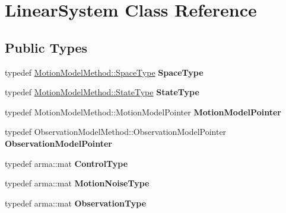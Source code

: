 \hypertarget{class_linear_system}{\section{\-Linear\-System \-Class \-Reference}
\label{class_linear_system}
}
\subsection*{\-Public \-Types}
\begin{DoxyCompactItemize}
\item 
\hypertarget{class_linear_system_a6e2a2cea01eb7d624ebddbd35da87391}{typedef \*
\hyperlink{class_s_e2_belief_space}{\-Motion\-Model\-Method\-::\-Space\-Type} {\bfseries \-Space\-Type}}\label{class_linear_system_a6e2a2cea01eb7d624ebddbd35da87391}

\item 
\hypertarget{class_linear_system_a18a7ea2657a1fbca633a2dfb92fbdfcc}{typedef \*
\hyperlink{class_s_e2_belief_space_1_1_state_type}{\-Motion\-Model\-Method\-::\-State\-Type} {\bfseries \-State\-Type}}\label{class_linear_system_a18a7ea2657a1fbca633a2dfb92fbdfcc}

\item 
\hypertarget{class_linear_system_a45a2dc5d393c50bc2d475cd9f4ff1db0}{typedef \*
\-Motion\-Model\-Method\-::\-Motion\-Model\-Pointer {\bfseries \-Motion\-Model\-Pointer}}\label{class_linear_system_a45a2dc5d393c50bc2d475cd9f4ff1db0}

\item 
\hypertarget{class_linear_system_a239819b1a3b5554c9b1ffbe669492b6e}{typedef \*
\-Observation\-Model\-Method\-::\-Observation\-Model\-Pointer {\bfseries \-Observation\-Model\-Pointer}}\label{class_linear_system_a239819b1a3b5554c9b1ffbe669492b6e}

\item 
\hypertarget{class_linear_system_ac89acd811aeb518081df96fb3904b176}{typedef arma\-::mat {\bfseries \-Control\-Type}}\label{class_linear_system_ac89acd811aeb518081df96fb3904b176}

\item 
\hypertarget{class_linear_system_abdf29233ee72fe498a01fe4bae172efd}{typedef arma\-::mat {\bfseries \-Motion\-Noise\-Type}}\label{class_linear_system_abdf29233ee72fe498a01fe4bae172efd}

\item 
\hypertarget{class_linear_system_a331ff229efb09e79a474ab87f246b0c6}{typedef arma\-::mat {\bfseries \-Observation\-Type}}\label{class_linear_system_a331ff229efb09e79a474ab87f246b0c6}


\end{DoxyCompactItemize}
